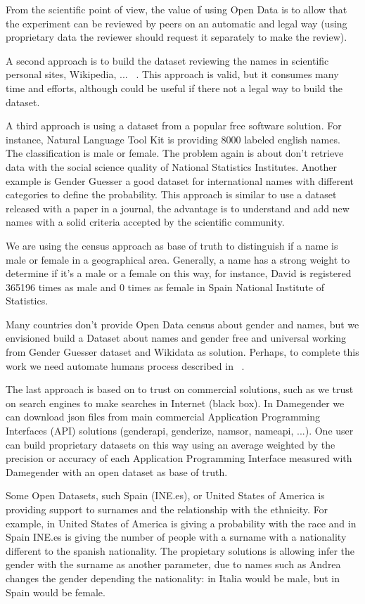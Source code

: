 \documentclass[fleqn,10pt]{wlpeerj} %
\begin{document}
From the scientific point of view, the value of using Open Data is to
allow that the experiment can be reviewed by peers on an automatic and
legal way (using proprietary data the reviewer should request it
separately to make the review).

A second approach is to build the dataset reviewing the names in
scientific personal sites, Wikipedia,
... ~\cite{10.7717/peerj-cs.156}. This approach is valid, but it
consumes many time and efforts, although could be useful if there not
a legal way to build the dataset.

A third approach is using a dataset from a popular free software
solution. For instance, Natural Language Tool Kit is providing 8000
labeled english names. The classification is male or female. The
problem again is about don't retrieve data with the social science
quality of National Statistics Institutes. Another example is Gender
Guesser a good dataset for international names with different
categories to define the probability. This approach is similar to use
a dataset released with a paper in a journal, the advantage is to
understand and add new names with a solid criteria accepted by the
scientific community.

We are using the census approach as base of truth to distinguish if a
name is male or female in a geographical area. Generally, a name has a
strong weight to determine if it's a male or a female on this way, for
instance, David is registered 365196 times as male and 0 times as
female in Spain National Institute of Statistics.

Many countries don't provide Open Data census about gender and names,
but we envisioned build a Dataset about names and gender free and
universal working from Gender Guesser dataset and Wikidata as
solution. Perhaps, to complete this work we need automate humans
process described in ~\cite{10.7717/peerj-cs.156}.

The last approach is based on to trust on commercial solutions, such
as we trust on search engines to make searches in Internet (black
box).  In Damegender we can download json files from main commercial
Application Programming Interfaces (API) solutions (genderapi,
genderize, namsor, nameapi, ...). One user can build proprietary
datasets on this way using an average weighted by the precision or
accuracy of each Application Programming Interface measured with
Damegender with an open dataset as base of truth.

Some Open Datasets, such Spain (INE.es), or United States of America
is providing support to surnames and the relationship with the
ethnicity. For example, in United States of America is giving a
probability with the race and in Spain INE.es is giving the number of
people with a surname with a nationality different to the spanish
nationality. The propietary solutions is allowing infer the gender
with the surname as another parameter, due to names such as Andrea
changes the gender depending the nationality: in Italia would be male,
but in Spain would be female.
\end{document}
